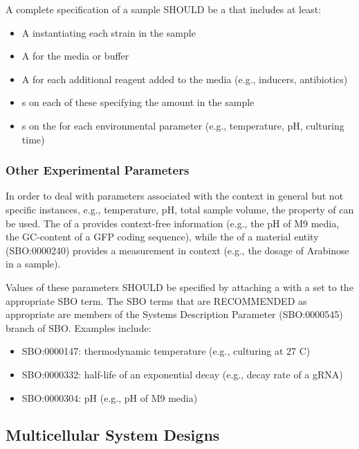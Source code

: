 A complete specification of a sample SHOULD be a  that includes at least:
\begin{itemize}
\item A  instantiating each strain in the sample
\item A  for the media or buffer
\item A  for each additional reagent added to the media (e.g., inducers, antibiotics)
\item {}s on each of these specifying the amount in the sample
\item {}s on the  for each environmental parameter (e.g., temperature, pH, culturing time)
\end{itemize}

\subsubsection{Other Experimental Parameters}

In order to deal with parameters associated with the context in general but not specific instances, e.g., temperature, pH, total sample volume, the  property of  can be used.  The  of a  provides context-free information (e.g., the pH of M9 media, the GC-content of a GFP coding sequence), while the  of a material entity (SBO:0000240)  provides a measurement in context (e.g., the dosage of Arabinose in a sample).

Values of these parameters SHOULD be specified by attaching a  with a  set to the appropriate SBO term. The SBO terms that are RECOMMENDED as appropriate are members of the Systems Description Parameter (SBO:0000545) branch of SBO. Examples include:
\begin{itemize}
\item SBO:0000147: thermodynamic temperature (e.g., culturing at 27 C)
\item SBO:0000332: half-life of an exponential decay (e.g., decay rate of a gRNA)
\item SBO:0000304: pH (e.g., pH of M9 media)
\end{itemize}


\subsection{Multicellular System Designs}


